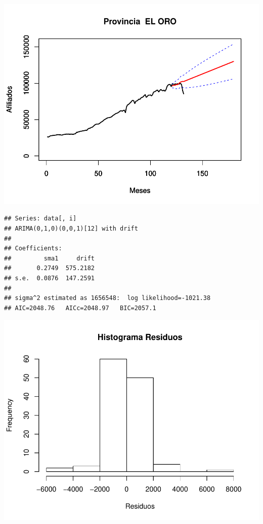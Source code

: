 \documentclass[11pt,a4paper,oneside]{article}\usepackage[]{graphicx}\usepackage[]{color}
\makeatletter
\def\maxwidth{ %
  \ifdim\Gin@nat@width>\linewidth
    \linewidth
  \else
    \Gin@nat@width
  \fi
}
\newenvironment{kframe}{%
 \def\at@end@of@kframe{}%
 \ifinner\ifhmode%
  \def\at@end@of@kframe{\end{minipage}}%
  \begin{minipage}{\columnwidth}%
 \fi\fi%
 \def\FrameCommand##1{\hskip\@totalleftmargin \hskip-\fboxsep
 \colorbox{shadecolor}{##1}\hskip-\fboxsep
     \hskip-\linewidth \hskip-\@totalleftmargin \hskip\columnwidth}%
 \MakeFramed {\advance\hsize-\width
   \@totalleftmargin\z@ \linewidth\hsize
   \@setminipage}}%
 {\par\unskip\endMakeFramed%
 \at@end@of@kframe}
\newenvironment{knitrout}{}{} %
\makeatother
\begin{document}
\begin{knitrout}
{\centering \includegraphics[width=\maxwidth]{figure/unnamed-chunk-16-19} 

}


\begin{kframe}\begin{verbatim}
## Series: data[, i] 
## ARIMA(0,1,0)(0,0,1)[12] with drift         
## 
## Coefficients:
##         sma1     drift
##       0.2749  575.2182
## s.e.  0.0876  147.2591
## 
## sigma^2 estimated as 1656548:  log likelihood=-1021.38
## AIC=2048.76   AICc=2048.97   BIC=2057.1
\end{verbatim}
\end{kframe}

{\centering \includegraphics[width=\maxwidth]{figure/unnamed-chunk-16-20} 

}
\end{knitrout}
\end{document}
